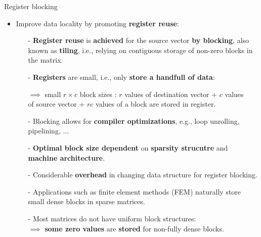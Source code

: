 \documentclass[t,usepdftitle=false]{beamer}
\begin{document}
\begin{frame}{Register blocking}
\begin{itemize}
\item Improve data locality by promoting \textbf{register reuse}:
\begin{itemize}\normalsize
\item[-] \textbf{Register reuse} is \textbf{achieved} for the source vector \textbf{by blocking}, also known as \textbf{tiling}, i.e., relying on contiguous storage of non-zero blocks in the matrix.\vspace{.05cm}
\item[-] \textbf{Registers} are small, i.e., only \textbf{store a handfull of data}:\vspace{.05cm}\\
\begin{center}$\implies$ small $r\times c$ block sizes : $r$ values of destination vector + $c$ values\\
\hspace{.25cm}of source vector + $rc$ values of a block are stored in register.\vspace{.05cm}\end{center}
\item[-] Blocking allows for \textbf{compiler optimizations}, e.g., loop unrolling, pipelining, ...\vspace{.05cm}
\item[-] \textbf{Optimal block size dependent} on \textbf{sparsity strucutre} and \textbf{machine architecture}.\vspace{.05cm}
\item[-] Considerable \textbf{overhead} in changing data structure for register blocking.\vspace{.05cm}
\item[-] Applications such as finite element methods (FEM) naturally store small dense blocks in sparse matrices.\vspace{.05cm}
\item[-] Most matrices do not have uniform block structures:\vspace{.05cm}\\
$\implies$ \textbf{some zero values} are \textbf{stored} for non-fully dense blocks.
\end{itemize}
\end{itemize}
\end{frame}
\end{document}
